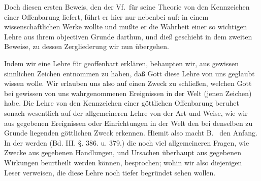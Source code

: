 Doch diesen ersten Beweis, den der Vf.\ für seine Theorie von den Kennzeichen einer Offenbarung liefert, führt er hier nur nebenbei auf: in einem wissenschaftlichen Werke wollte und mußte er die Wahrheit einer so wichtigen Lehre aus ihrem objectiven Grunde darthun, und dieß geschieht in dem zweiten Beweise, zu dessen Zergliederung wir nun übergehen. \par
Indem wir eine Lehre für geoffenbart erklären, behaupten wir, aus gewissen sinnlichen Zeichen entnommen zu haben, daß Gott diese Lehre von uns geglaubt wissen wolle. Wir erlauben uns also auf einen Zweck zu schließen, welchen Gott bei gewissen von uns wahrgenommenen Ereignissen in der Welt (jenen Zeichen) habe. Die Lehre von den Kennzeichen einer göttlichen Offenbarung beruhet sonach wesentlich auf der allgemeineren Lehre von der Art und Weise, wie wir aus gegebenen Ereignissen oder Einrichtungen in der Welt den bei denselben zu Grunde liegenden göttlichen Zweck erkennen. Hiemit also macht B.\  den Anfang. In der  werden (Bd. III. §. 386. u. 379.) die noch viel allgemeineren Fragen, wie Zwecke aus gegebenen Handlungen, und Ursachen überhaupt aus gegebenen Wirkungen beurtheilt werden können, besprochen; wohin wir also  diejenigen Leser verweisen, die diese Lehre noch tiefer begründet sehen wollen. \par
